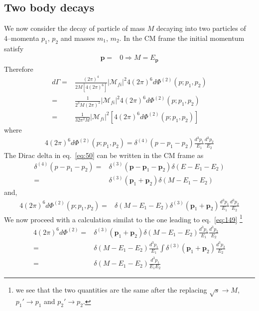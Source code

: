 \subsection{Two body decays}
We now consider the decay of particle of mass $M$ decaying into two particles of 4--momenta $p_1$, $p_2$ and masses $m_1$, $m_2$. In the CM frame the initial momentum satisfy
\begin{align}
  \mathbf{p}=&0\Rightarrow M=E_{\mathbf{p}}
\end{align}
Therefore 
\begin{align}
  \label{eq:51nn}
  d\Gamma=&\frac{(2\pi)^4}{2M[4(2\pi)^6]}\left|\mathcal{M}_{fi}\right|^2
4(2\pi)^6d \Phi^{(2)} (p; p_1, p_2)\nonumber\\
=&\frac{1}{2^3M(2\pi)^2}\left|\mathcal{M}_{fi}\right|^2
4(2\pi)^6d \Phi^{(2)} (p; p_1, p_2)\nonumber\\
=&\frac{1}{32 \pi^2M}\left|\mathcal{M}_{fi}\right|^2
\left[4(2\pi)^6d \Phi^{(2)} (p; p_1, p_2)\right]
\end{align}
where
\begin{align}
  4(2\pi)^6d \Phi^{(2)} (p; p_1, p_2)=\delta^{(4)}(p-p_1-p_2)\frac{d^3p_1}{E_{1}}\frac{d^3p_2}{E_{2}}
\end{align}
The Dirac delta in eq.~\eqref{eq:50} can be written in the CM frame as
\begin{align}
\label{eq:153}
  \delta^{(4)}(p-p_1-p_2)=&\delta^{(3)}(\mathbf{p}-\mathbf{p}_1-\mathbf{p}_2)\delta(E-E_1-E_2)\nonumber\\
=&\delta^{(3)}(\mathbf{p}_1+\mathbf{p}_2)\delta(M-E_1-E_2)
\end{align}
and,
\begin{align}
   4(2\pi)^6d \Phi^{(2)} (p; p_1, p_2)=&\delta(M-E_1-E_2)\delta^{(3)}(\mathbf{p}_1+\mathbf{p}_2)\frac{d^3p_1}{E_{1}}\frac{d^3p_2}{E_{2}}
\end{align}
We now proceed  with a calculation similat to the one leading to eq.~\eqref{eq:149} \footnote{ we see that the two quantities are the same after the replacing $\sqrt{s}\to M$, $p_1'\to p_1$ and $p_2'\to p_2$.} 
\begin{align}
\label{eq:149nn}
  4(2\pi)^6d\Phi^{(2)}=&\delta^{(3)}(\mathbf{p}_1+\mathbf{p}_2)\delta(M-E_1-E_2)
\frac{d^3p_1}{E_{1}}\frac{d^3p_2}{E_{2}}\nonumber\\
 =&\delta(M-E_1-E_2)
\frac{d^3p_1}{E_{1}}\int\delta^{(3)}(\mathbf{p}_1+\mathbf{p}_2)\frac{d^3p_2}{E_{2}}\nonumber\\
=&\delta(M-E_1-E_2)
\frac{d^3p_1}{E_{1}E_{2}}
\end{align}

